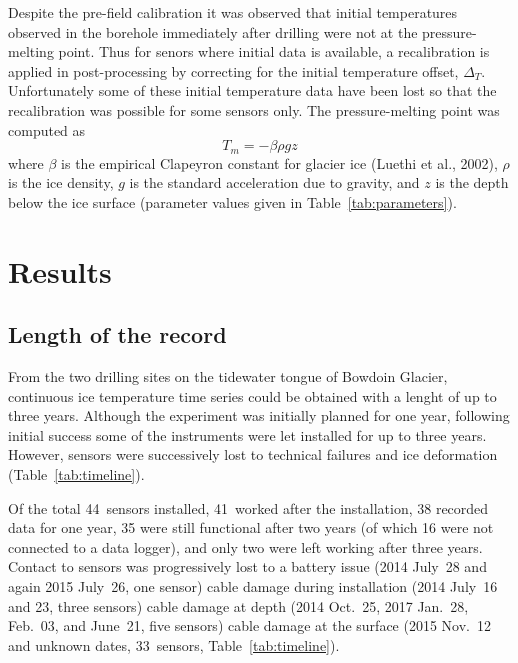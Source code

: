 \documentclass[utf8]{article}
\begin{document}
    Despite the pre-field calibration it was observed that initial temperatures
    observed in the borehole immediately after drilling were not at the
    pressure-melting point. Thus for senors where initial data is available,
    a recalibration is applied in post-processing by correcting for the initial
    temperature offset, $\Delta_T$. Unfortunately some of these initial
    temperature data have been lost so that the recalibration was possible for
    some sensors only. The pressure-melting point was computed as
    \begin{equation}
      T_m = -\beta \rho g z
    \end{equation}
    where $\beta$ is the empirical Clapeyron constant for glacier ice
    (Luethi et al., 2002), $\rho$ is the ice density, $g$ is the standard
    acceleration due to gravity, and $z$ is the depth below the ice surface
    (parameter values given in Table~\ref{tab:parameters}).


\section{Results}

\subsection{Length of the record}

    From the two drilling sites on the tidewater tongue of Bowdoin Glacier,
    continuous ice temperature time series could be obtained with a lenght of
    up to three years. Although the experiment was initially planned for one
    year, following initial success some of the instruments were let installed
    for up to three years. However, sensors were successively lost to technical
    failures and ice deformation (Table~\ref{tab:timeline}).

    Of the total 44~sensors installed, 41~worked after the installation, 38
    recorded data for one year, 35 were still functional after two years (of
    which 16 were not connected to a data logger), and only two were left
    working after three years. Contact to sensors was progressively lost to a
    battery issue (2014 July~28 and again 2015 July~26, one sensor) cable
    damage during installation (2014 July~16 and 23, three sensors) cable
    damage at depth (2014 Oct.~25, 2017 Jan.~28, Feb.~03, and June~21, five
    sensors) cable damage at the surface (2015 Nov.~12 and unknown dates,
    33~sensors, Table~\ref{tab:timeline}).
\end{document}
